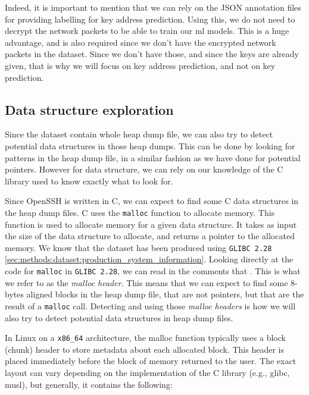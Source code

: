     Indeed, it is important to mention that we can rely on the JSON annotation files for providing labelling for key address prediction. Using this, we do not need to decrypt the network packets to be able to train our \acrshort{ml} models. This is a huge advantage, and is also required since we don't have the encrypted network packets in the dataset. Since we don't have those, and since the keys are already given, that is why we will focus on key address prediction, and not on key prediction.

    \subsection{Data structure exploration}
    Since the dataset contain whole heap dump file, we can also try to detect potential data structures in those heap dumps. This can be done by looking for patterns in the heap dump file, in a similar fashion as we have done for potential pointers. However for data structure, we can rely on our knowledge of the C library used to know exactly what to look for.
    
    Since OpenSSH is written in C, we can expect to find some C data structures in the heap dump files. C uses the \lstinline[language=c]|malloc| function to allocate memory. This function is used to allocate memory for a given data structure. It takes as input the size of the data structure to allocate, and returns a pointer to the allocated memory. We know that the dataset has been produced using \texttt{GLIBC 2.28} \ref{sec:methods:dataset:production_system_information}. Looking directly at the code for \lstinline[language=c]|malloc| in \texttt{GLIBC 2.28}, we can read in the comments that  \cite{MallocGLIBC2001}. This is what we refer to as the \textit{malloc header}. This means that we can expect to find some 8-bytes aligned blocks in the heap dump file, that are not pointers, but that are the result of a \lstinline[language=c]|malloc| call. Detecting and using those \textit{malloc headers} is how we will also try to detect potential data structures in heap dump files.

    In Linux on a \texttt{x86\_64} architecture, the malloc function typically uses a block (chunk) header to store metadata about each allocated block. This header is placed immediately before the block of memory returned to the user. The exact layout can vary depending on the implementation of the C library (e.g., glibc, musl), but generally, it contains the following:

